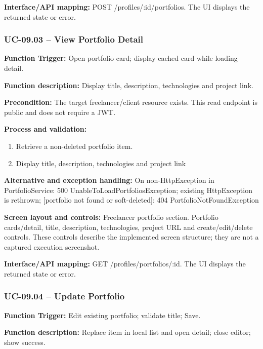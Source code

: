 \textbf{Interface/\allowbreak{}API mapping:} POST /\allowbreak{}profiles/\allowbreak{}:id/\allowbreak{}portfolios. The UI displays the returned state or error.

\subsubsection{UC-09.03 -- View Portfolio Detail}
\textbf{Function Trigger:} Open portfolio card; display cached card while loading detail.

\textbf{Function description:} Display title, description, technologies and project link.

\textbf{Precondition:} The target freelancer/\allowbreak{}client resource exists. This read endpoint is public and does not require a JWT.

\textbf{Process and validation:}
\begin{enumerate}
\item Retrieve a non-deleted portfolio item.
\item Display title, description, technologies and project link
\end{enumerate}
\textbf{Alternative and exception handling:} On non-Http\allowbreak{}Exception in Portfolio\allowbreak{}Service: 500 Unable\allowbreak{}To\allowbreak{}Load\allowbreak{}Portfolios\allowbreak{}Exception; existing Http\allowbreak{}Exception is rethrown; [portfolio not found or soft-deleted]: 404 Portfolio\allowbreak{}Not\allowbreak{}Found\allowbreak{}Exception

\textbf{Screen layout and controls:} Freelancer portfolio section. Portfolio cards/\allowbreak{}detail, title, description, technologies, project URL and create/\allowbreak{}edit/\allowbreak{}delete controls. These controls describe the implemented screen structure; they are not a captured execution screenshot.

\textbf{Interface/\allowbreak{}API mapping:} GET /\allowbreak{}profiles/\allowbreak{}portfolios/\allowbreak{}:id. The UI displays the returned state or error.

\subsubsection{UC-09.04 -- Update Portfolio}
\textbf{Function Trigger:} Edit existing portfolio; validate title; Save.

\textbf{Function description:} Replace item in local list and open detail; close editor; show success.

